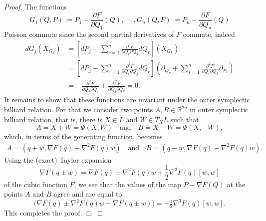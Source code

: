 \documentclass[12pt]{article}
\newcommand{\proofend}{$\Box$\bigskip}
\newcommand{\R}{{\mathbb R}}
\begin{document}
\begin{proof}
The functions
\begin{equation}\nonumber
G_1(Q, P):=P_1-\frac{\partial F}{\partial Q_1}(Q),\;\cdots\;,G_n(Q,P):=P_n-\frac{\partial F}{\partial Q_n}(Q)
\end{equation}  
Poisson commute since the second partial derivatives of $F$ commute, indeed
\begin{equation}\nonumber
\begin{aligned}
dG_j(X_{G_k})&=\left[dP_j-\sum_{r=1}^n \frac{\partial^2F}{\partial Q_r\partial Q_j}dQ_r\right](X_{G_k})\\
&=\left[dP_j-\sum_{r=1}^n \frac{\partial^2F}{\partial Q_r\partial Q_j}dQ_r\right]\left(\partial_{Q_k}+\sum_{s=1}^n \frac{\partial^2F}{\partial Q_s\partial Q_k}\partial_{P_s}\right)\\
&=-\frac{\partial^2F}{\partial Q_k\partial Q_j}+\frac{\partial^2F}{\partial Q_j\partial Q_k}=0.
\end{aligned}
\end{equation}
%
It remains to show that these functions are invariant under the outer symplectic billiard relation. For that we consider two points $A,B\in\R^{2n}$ in outer symplectic billiard relation, that is, there is $X\in L$ and $W\in T_XL$ such that
\begin{equation*}%
A=X+W=\Psi(X,W)\quad\text{and}\quad B=X-W=\Psi(X,-W),
\end{equation*}
which, in terms of the generating function, becomes
\begin{equation*}%
\begin{aligned}
A=(q+w,\nabla F(q)+\nabla^2F(q)w)\quad\text{and}\quad B=(q-w,\nabla F(q)-\nabla^2F(q)w).
\end{aligned}
\end{equation*}
Using the (exact) Taylor expansion 
$$\nabla F(q\pm w)=\nabla F(q)\pm\nabla^2F(q)w+\frac12\nabla^3F(q)[w,w]$$
of the cubic function $F$, we see that the values of the map $P-\nabla F(Q)$ at the points $A$ and $B$ agree and are equal to
\begin{equation}\nonumber
\big(\nabla F(q)\pm\nabla^2F(q)w-\nabla F(q\pm w)\big)= -\tfrac12\nabla^3F(q)[w,w].
\end{equation}
This completes the proof. \proofend  
\end{proof}
\end{document}
